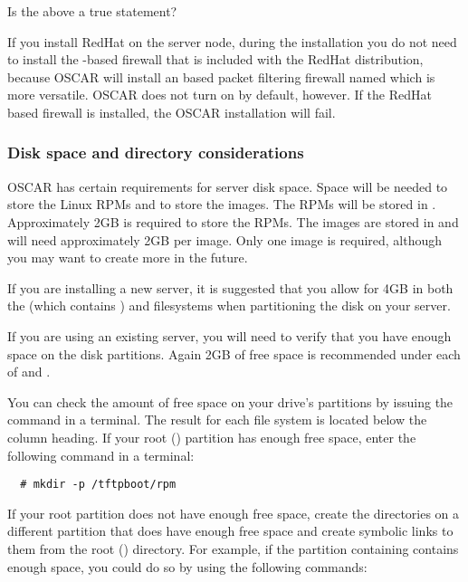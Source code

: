 \begin{discuss}
  Is the above a true statement?
\end{discuss}

If you install RedHat on the server node, during the installation you
do not need to install the -based firewall that is
included with the RedHat distribution, because OSCAR will install an
 based packet filtering firewall named
 which is more versatile.  OSCAR does not turn on
 by default, however.  If the RedHat
 based firewall is installed, the OSCAR installation
will fail.


\subsubsection{Disk space and directory considerations}
\label{det:serverdiskpar}

OSCAR has certain requirements for server disk space. Space will be
needed to store the Linux RPMs and to store the images.  The RPMs will
be stored in . Approximately 2GB is required to
store the RPMs.  The images are stored in 
and will need approximately 2GB per image. Only one image is required,
although you may want to create more in the future.

If you are installing a new server, it is suggested that you allow for
4GB in both the \file{/} (which contains ) and
 filesystems when partitioning the disk on your server.

If you are using an existing server, you will need to verify that you
have enough space on the disk partitions.  Again 2GB of free space is
recommended under each of \file{/} and .

You can check the amount of free space on your drive's partitions by
issuing the command  in a terminal.  The result for each
file system is located below the  column heading. If
your root (\file{/}) partition has enough free space, enter the
following command in a terminal:

\begin{verbatim}
  # mkdir -p /tftpboot/rpm
\end{verbatim}
  
If your root partition does not have enough free space, create the
directories on a different partition that does have enough free space
and create symbolic links to them from the root (\file{/}) directory.
For example, if the partition containing  contains enough
space, you could do so by using the following commands:

